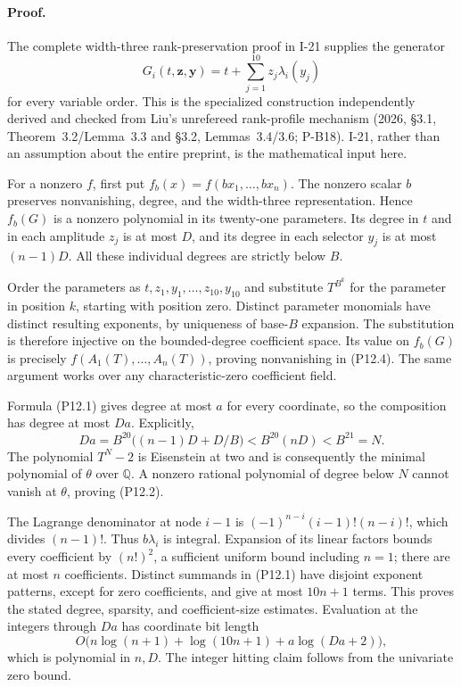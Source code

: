 \paragraph{Proof.}
The complete width-three rank-preservation proof in I-21 supplies the generator
\[
 G_i(t,\mathbf z,\mathbf y)=t+\sum_{j=1}^{10}z_j\lambda_i(y_j)
\]
for every variable order.  This is the specialized construction independently derived and checked from Liu's unrefereed rank-profile mechanism (2026, \S3.1, Theorem~3.2/Lemma~3.3 and \S3.2, Lemmas~3.4/3.6; P-B18).  I-21, rather than an assumption about the entire preprint, is the mathematical input here.

For a nonzero $f$, first put $f_b(x)=f(bx_1,\ldots,bx_n)$.  The nonzero scalar $b$ preserves nonvanishing, degree, and the width-three representation.  Hence $f_b(G)$ is a nonzero polynomial in its twenty-one parameters.  Its degree in $t$ and in each amplitude $z_j$ is at most $D$, and its degree in each selector $y_j$ is at most $(n-1)D$.  All these individual degrees are strictly below $B$.

Order the parameters as $t,z_1,y_1,\ldots,z_{10},y_{10}$ and substitute $T^{B^k}$ for the parameter in position $k$, starting with position zero.  Distinct parameter monomials have distinct resulting exponents, by uniqueness of base-$B$ expansion.  The substitution is therefore injective on the bounded-degree coefficient space.  Its value on $f_b(G)$ is precisely $f(A_1(T),\ldots,A_n(T))$, proving nonvanishing in (P12.4).  The same argument works over any characteristic-zero coefficient field.

Formula (P12.1) gives degree at most $a$ for every coordinate, so the composition has degree at most $Da$.  Explicitly,
\[
 Da=B^{20}\bigl((n-1)D+D/B\bigr)
      <B^{20}(nD)<B^{21}=N.
\]
The polynomial $T^N-2$ is Eisenstein at two and is consequently the minimal polynomial of $\theta$ over $\mathbb Q$.  A nonzero rational polynomial of degree below $N$ cannot vanish at $\theta$, proving (P12.2).

The Lagrange denominator at node $i-1$ is
$(-1)^{n-i}(i-1)!(n-i)!$, which divides $(n-1)!$.  Thus $b\lambda_i$ is integral.  Expansion of its linear factors bounds every coefficient by $(n!)^2$, a sufficient uniform bound including $n=1$; there are at most $n$ coefficients.  Distinct summands in (P12.1) have disjoint exponent patterns, except for zero coefficients, and give at most $10n+1$ terms.  This proves the stated degree, sparsity, and coefficient-size estimates.  Evaluation at the integers through $Da$ has coordinate bit length
\[
 O\bigl(n\log(n+1)+\log(10n+1)+a\log(Da+2)\bigr),
\]
which is polynomial in $n,D$.  The integer hitting claim follows from the univariate zero bound.


